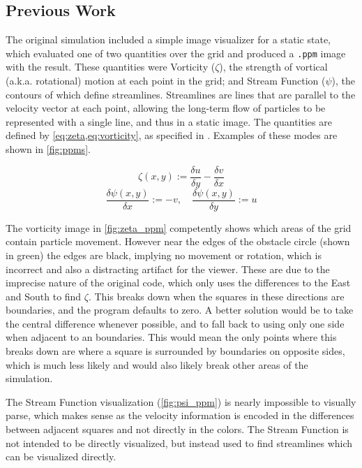 \subsection{Previous Work}\label{sec:Research:Viz:ACA}
The original simulation\cite{modules:CS257Coursework} included a simple image visualizer for a static state, which evaluated one of two quantities over the grid and produced a \texttt{.ppm} image with the result.
These quantities were Vorticity ($\zeta$), the strength of vortical (a.k.a. rotational) motion at each point in the grid; and Stream Function ($\psi$), the contours of which define streamlines.
Streamlines are lines that are parallel to the velocity vector at each point, allowing the long-term flow of particles to be represented with a single line, and thus in a static image.\cite{NASADefinitionStreamlines}
The quantities are defined by \cref{eq:zeta,eq:vorticity}, as specified in \cite{book:griebel1998numerical}.
Examples of these modes are shown in \cref{fig:ppms}.

\begin{equation}
    \zeta(x,y) := \frac{\delta{u}}{\delta{y}} - \frac{\delta{v}}{\delta{x}}
    \label{eq:zeta}
\end{equation}
\begin{equation}
    \frac{\delta{\psi}(x,y)}{\delta{x}} := -v,\quad \frac{\delta{\psi}(x,y)}{\delta{y}} := u
    \label{eq:vorticity}
\end{equation}


The vorticity image in \cref{fig:zeta_ppm} competently shows which areas of the grid contain particle movement.
However near the edges of the obstacle circle (shown in green) the edges are black, implying no movement or rotation, which is incorrect and also a distracting artifact for the viewer.
These are due to the imprecise nature of the original code, which only uses the differences to the East and South to find $\zeta$.
This breaks down when the squares in these directions are boundaries, and the program defaults to zero.
A better solution would be to take the central difference whenever possible, and to fall back to using only one side when adjacent to an boundaries.
This would mean the only points where this breaks down are where a square is surrounded by boundaries on opposite sides, which is much less likely and would also likely break other areas of the simulation.

The Stream Function visualization (\cref{fig:psi_ppm}) is nearly impossible to visually parse, which makes sense as the velocity information is encoded in the differences between adjacent squares and not directly in the colors.
The Stream Function is not intended to be directly visualized, but instead used to find streamlines which can be visualized directly.

